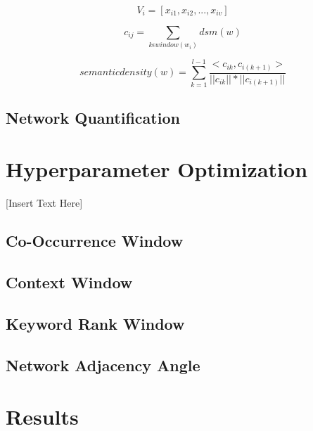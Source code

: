 \documentclass[11pt]{article}
\begin{document}
\begin{equation}
V_{i}=[x_{i1},x_{i2},...,x_{iv}]
\end{equation}

\begin{equation}
c_{ij}=\sum_{k \epsilon window(w_{i})} dsm(w)
\end{equation}

\begin{equation}
semantic density(w) = \sum_{k=1}^{l-1} \frac{<c_{ik},c_{i(k+1)}>}{||c_{ik}||*||c_{i(k+1)}||}
\end{equation}


\subsection{Network Quantification}
\label{sect:network}

\section{Hyperparameter Optimization}
\label{hyper}

[Insert Text Here]

\subsection{Co-Occurrence Window}
\label{cooc window}


\subsection{Context Window}
\label{sect:context window}


\subsection{Keyword Rank Window}
\label{sect:keyword}


\subsection{Network Adjacency Angle}
\label{sect:angle}

\section{Results}
\label{results}
\end{document}
